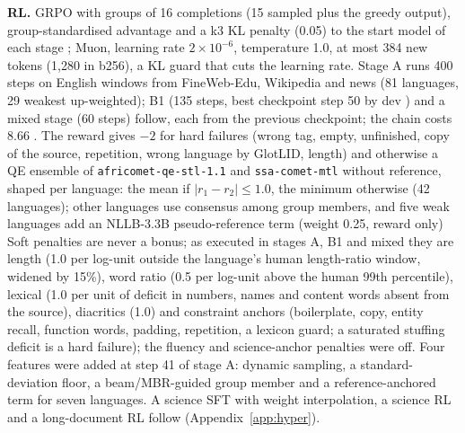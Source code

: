 \textbf{RL.} GRPO with groups of 16 completions (15 sampled plus the greedy output), group-standardised advantage and a k3 KL penalty (0.05) to the start model of each stage \citep{shao2024deepseekmath}; Muon, learning rate $2\times10^{-6}$, temperature 1.0, at most 384 new tokens (1,280 in b256), a KL guard that cuts the learning rate. Stage A runs 400 steps on English windows from FineWeb-Edu, Wikipedia and news (81 languages, 29 weakest up-weighted); B1 (135 steps, best checkpoint step 50 by dev \chrfpp{}) and a mixed stage (60 steps) follow, each from the previous checkpoint; the chain costs 8.66 \GPUh{}. The reward gives $-2$ for hard failures (wrong tag, empty, unfinished, copy of the source, repetition, wrong language by GlotLID, length) and otherwise a QE ensemble of \texttt{africomet-qe-stl-1.1} and \texttt{ssa-comet-mtl} without reference, shaped per language: the mean if $|r_1-r_2|\le1.0$, the minimum otherwise (42 languages); other languages use consensus \chrfpp{} among group members, and five weak languages add an NLLB-3.3B pseudo-reference term (weight 0.25, reward only) Soft penalties are never a bonus; as executed in stages A, B1 and mixed they are length (1.0 per log-unit outside the language's human length-ratio window, widened by 15\%), word ratio (0.5 per log-unit above the human 99th percentile), lexical (1.0 per unit of deficit in numbers, names and content words absent from the source), diacritics (1.0) and constraint anchors (boilerplate, copy, entity recall, function words, padding, repetition, a lexicon guard; a saturated stuffing deficit is a hard failure); the fluency and science-anchor penalties were off. Four features were added at step 41 of stage A: dynamic sampling, a standard-deviation floor, a beam/MBR-guided group member and a reference-anchored term for seven languages. A science SFT with weight interpolation, a science RL and a long-document RL follow (Appendix~\ref{app:hyper}).
